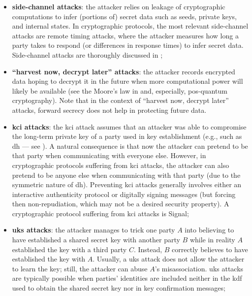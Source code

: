 \begin{itemize}
	\item \textbf{side-channel attacks}: the attacker relies on leakage of cryptographic computations to infer (portions of) secret data such as seeds, private keys, and internal states. In cryptographic protocols, the most relevant side-channel attacks are remote timing attacks, where the attacker measures how long a party takes to respond (or differences in response times) to infer secret data. Side-channel attacks are thoroughly discussed in ;
	
	\item \textbf{``harvest now, decrypt later'' attacks}: the attacker records encrypted data hoping to decrypt it in the future when more computational power will likely be available (see the Moore's law in  and, especially, pos-quantum cryptography).
	Note that in the context of ``harvest now, decrypt later'' attacks, forward secrecy does not help in protecting future data.
	
	\item \textbf{\gls{kci} attacks}: the \gls{kci} attack assumes that an attacker was able to compromise the long-term private key of a party used in key establishment (e.g., such as \gls{dh} --- see ). A natural consequence is that now the attacker can pretend to be that party when communicating with everyone else. However, in cryptographic protocols suffering from \gls{kci} attacks, the attacker can also pretend to be anyone else when communicating with that party (due to the symmetric nature of \gls{dh}). Preventing \gls{kci} attacks generally involves either an interactive authenticity protocol or digitally signing messages (but forcing then non-repudiation, which may not be a desired security property). A cryptographic protocol suffering from \gls{kci} attacks is Signal;
	
	\item \textbf{\gls{uks} attacks}: the attacker manages to trick one party $A$ into believing to have established a shared secret key with another party $B$ while in reality $A$ established the key with a third party $C$. Instead, $B$ correctly believes to have established the key with $A$. Usually, a \gls{uks} attack does not allow the attacker to learn the key; still, the attacker can abuse $A$'s misassociation. \gls{uks} attacks are typically possible when parties' identities are included neither in the \gls{kdf} used to obtain the shared secret key nor in key confirmation messages;
	

\end{itemize}
